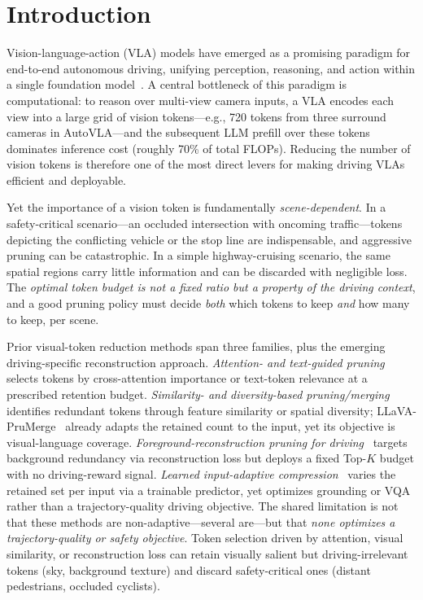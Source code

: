 \documentclass[letterpaper]{article} %
\begin{document}
\section{Introduction}
\label{sec:intro}

Vision-language-action (VLA) models have emerged as a promising paradigm for
end-to-end autonomous driving, unifying perception, reasoning, and action within
a single foundation model~\citep{openvla2024}.
A central bottleneck of this paradigm is computational: to reason over
multi-view camera inputs, a VLA encodes each view into a large grid of vision
tokens---e.g., 720 tokens from three surround cameras in AutoVLA---and the
subsequent LLM prefill over these tokens dominates inference cost (roughly 70\%
of total FLOPs).
Reducing the number of vision tokens is therefore one of the most direct levers
for making driving VLAs efficient and deployable.

Yet the importance of a vision token is fundamentally \emph{scene-dependent}.
In a safety-critical scenario---an occluded intersection with oncoming
traffic---tokens depicting the conflicting vehicle or the stop line are
indispensable, and aggressive pruning can be catastrophic.
In a simple highway-cruising scenario, the same spatial regions carry little
information and can be discarded with negligible loss.
The \emph{optimal token budget is not a fixed ratio but a property of the
driving context}, and a good pruning policy must decide \emph{both} which
tokens to keep \emph{and} how many to keep, per scene.

Prior visual-token reduction methods span three families, plus the emerging
driving-specific reconstruction approach.
\emph{Attention- and text-guided pruning}~\citep{chen2024fastv,xu2024sparsevlm}
selects tokens by cross-attention importance or text-token relevance at a
prescribed retention budget.
\emph{Similarity- and diversity-based pruning/merging}~\citep{shang2024llavaprumerge,topv2025,visionzip2025}
identifies redundant tokens through feature similarity or spatial diversity;
LLaVA-PruMerge~\citep{shang2024llavaprumerge} already adapts the retained
count to the input, yet its objective is visual-language coverage.
\emph{Foreground-reconstruction pruning for driving}~\citep{fastdrivevla2026}
targets background redundancy via reconstruction loss but deploys a fixed
Top-$K$ budget with no driving-reward signal.
\emph{Learned input-adaptive compression}~\citep{atpllava2025,glimpseprune2025}
varies the retained set per input via a trainable predictor, yet optimizes
grounding or VQA rather than a trajectory-quality driving objective.
The shared limitation is not that these methods are non-adaptive---several
are---but that \emph{none optimizes a trajectory-quality or safety objective}.
Token selection driven by attention, visual similarity, or reconstruction loss
can retain visually salient but driving-irrelevant tokens (sky, background
texture) and discard safety-critical ones (distant pedestrians, occluded
cyclists).
\end{document}
